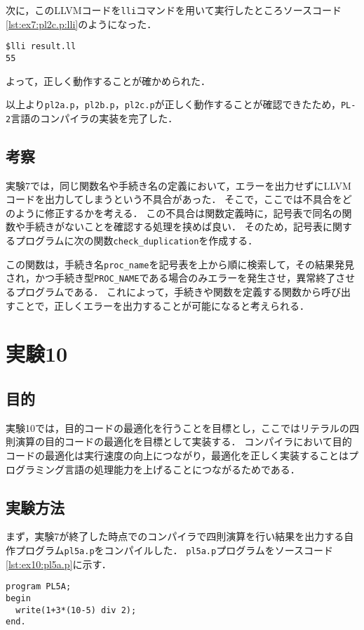 \documentclass[uplatex]{jsarticle}
\begin{document}
次に，このLLVMコードを\verb#lli#コマンドを用いて実行したところソースコード\ref{lst:ex7:pl2c.p:lli}のようになった．

\begin{lstlisting}[caption=lliコマンド,label=lst:ex7:pl2c.p:lli]
$lli result.ll
55
\end{lstlisting}

よって，正しく動作することが確かめられた．

以上より\verb#pl2a.p#，\verb#pl2b.p#，\verb#pl2c.p#が正しく動作することが確認できたため，\verb#PL-2#言語のコンパイラの実装を完了した．

\subsection{考察}
実験7では，同じ関数名や手続き名の定義において，エラーを出力せずにLLVMコードを出力してしまうという不具合があった．
そこで，ここでは不具合をどのように修正するかを考える．
この不具合は関数定義時に，記号表で同名の関数や手続きがないことを確認する処理を挟めば良い．
そのため，記号表に関するプログラムに次の関数\verb#check_duplication#を作成する．

この関数は，手続き名\verb#proc_name#を記号表を上から順に検索して，その結果発見され，かつ手続き型\verb#PROC_NAME#である場合のみエラーを発生させ，異常終了させるプログラムである．
これによって，手続きや関数を定義する関数から呼び出すことで，正しくエラーを出力することが可能になると考えられる．

\section{実験10}
\subsection{目的}
実験10では，目的コードの最適化を行うことを目標とし，ここではリテラルの四則演算の目的コードの最適化を目標として実装する．
コンパイラにおいて目的コードの最適化は実行速度の向上につながり，最適化を正しく実装することはプログラミング言語の処理能力を上げることにつながるためである．

\subsection{実験方法}
まず，実験7が終了した時点でのコンパイラで四則演算を行い結果を出力する自作プログラム\verb#pl5a.p#をコンパイルした．
\verb#pl5a.p#プログラムをソースコード\ref{lst:ex10:pl5a.p}に示す．
\begin{lstlisting}[caption=pl5a.p,label=lst:ex10:pl5.p]
program PL5A;
begin
  write(1+3*(10-5) div 2);
end.
\end{lstlisting}
\end{document}
